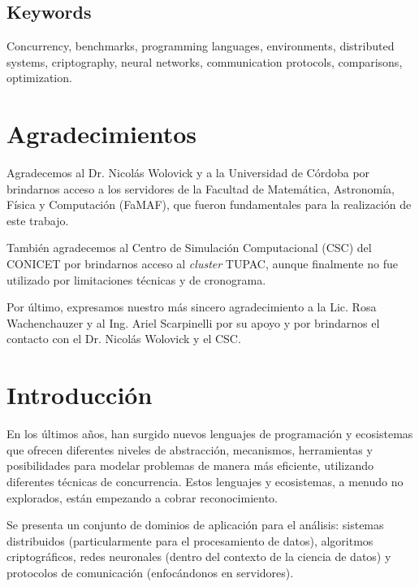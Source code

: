 \documentclass[11pt]{article}
\let\Oldsection\section
\renewcommand{\section}{\FloatBarrier\Oldsection}
\let\Oldsubsection\subsection
\renewcommand{\subsection}{\FloatBarrier\Oldsubsection}
\newcommand{\english}[1]{\textit{#1}}
\begin{document}
\subsection{Keywords}

\begin{otherlanguage}{english}
Concurrency, benchmarks, programming languages, environments, distributed systems, criptography, neural networks, communication protocols, comparisons, optimization.
\end{otherlanguage}

\newpage

\section{Agradecimientos}

Agradecemos al Dr. Nicolás Wolovick y a la Universidad de Córdoba por brindarnos acceso a los servidores de la Facultad de Matemática, Astronomía, Física y Computación (FaMAF), que fueron fundamentales para la realización de este trabajo.

También agradecemos al Centro de Simulación Computacional (CSC) del CONICET por brindarnos acceso al \english{cluster} TUPAC, aunque finalmente no fue utilizado por limitaciones técnicas y de cronograma.

Por último, expresamos nuestro más sincero agradecimiento a la Lic. Rosa Wachenchauzer y al Ing. Ariel Scarpinelli por su apoyo y por brindarnos el contacto con el Dr. Nicolás Wolovick y el CSC.

\newpage

\section{Introducción}

En los últimos años, han surgido nuevos lenguajes de programación y ecosistemas que ofrecen diferentes niveles de abstracción, mecanismos, herramientas y posibilidades para modelar problemas de manera más eficiente, utilizando diferentes técnicas de concurrencia. Estos lenguajes y ecosistemas, a menudo no explorados, están empezando a cobrar reconocimiento.

Se presenta un conjunto de dominios de aplicación para el análisis: sistemas distribuidos (particularmente para el procesamiento de datos), algoritmos criptográficos, redes neuronales (dentro del contexto de la ciencia de datos) y protocolos de comunicación (enfocándonos en servidores).
\end{document}
